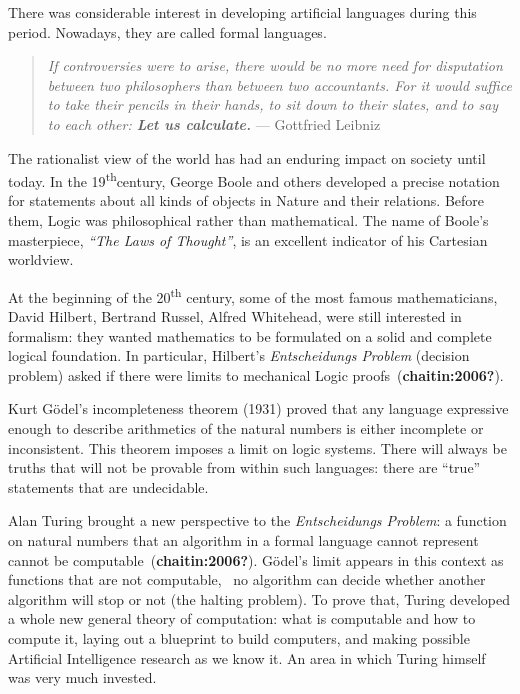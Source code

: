 \documentclass[
  letterpaper,
  DIV=11,
  numbers=noendperiod,
  oneside]{scrreprt}
\begin{document}
There was considerable interest in developing artificial languages
during this period. Nowadays, they are called formal languages.

\begin{quote}
\emph{If controversies were to arise, there would be no more need for
disputation between two philosophers than between two accountants. For
it would suffice to take their pencils in their hands, to sit down to
their slates, and to say to each other: \textbf{Let us calculate.}} ---
Gottfried Leibniz
\end{quote}

The rationalist view of the world has had an enduring impact on society
until today. In the 19\textsuperscript{th}century, George Boole and
others developed a precise notation for statements about all kinds of
objects in Nature and their relations. Before them, Logic was
philosophical rather than mathematical. The name of Boole's masterpiece,
\emph{``The Laws of Thought''}, is an excellent indicator of his
Cartesian worldview.

At the beginning of the 20\textsuperscript{th} century, some of the most
famous mathematicians, David Hilbert, Bertrand Russel, Alfred Whitehead,
were still interested in formalism: they wanted mathematics to be
formulated on a solid and complete logical foundation. In particular,
Hilbert's \emph{Entscheidungs Problem} (decision problem) asked if there
were limits to mechanical Logic proofs~(\textbf{chaitin:2006?}).

Kurt Gödel's incompleteness theorem (1931) proved that any language
expressive enough to describe arithmetics of the natural numbers is
either incomplete or inconsistent. This theorem imposes a limit on logic
systems. There will always be truths that will not be provable from
within such languages: there are ``true'' statements that are
undecidable.

Alan Turing brought a new perspective to the \emph{Entscheidungs
Problem}: a function on natural numbers that an algorithm in a formal
language cannot represent cannot be computable~(\textbf{chaitin:2006?}).
Gödel's limit appears in this context as functions that are not
computable, ~no algorithm can decide whether another algorithm will stop
or not (the halting problem). To prove that, Turing developed a whole
new general theory of computation: what is computable and how to compute
it, laying out a blueprint to build computers, and making possible
Artificial Intelligence research as we know it. An area in which Turing
himself was very much invested.
\end{document}

